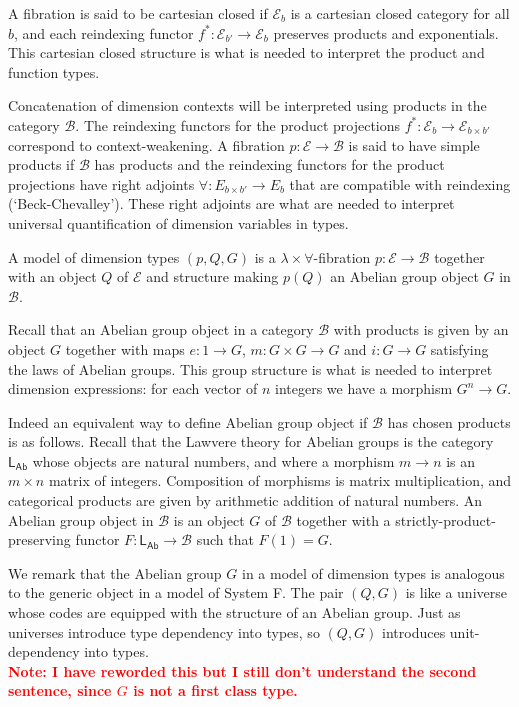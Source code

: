 \documentclass[a4paper,UKenglish]{lipics}
\newcommand\note[1]{{ \bf \textcolor{red} {\vspace{2mm}\; \\ Note: #1\\}}}
\newcommand{\msf}[1]{\mathsf{#1}} %
\newcommand{\LAb}{\msf{L}_{\msf{Ab}}}
\newcommand{\B}{\mathcal{B}}
\newcommand{\E}{\mathcal{E}}
\begin{document}
A fibration is said to be cartesian closed if $\E_b$ is a cartesian closed category for all $b$,
and each reindexing functor $f^*:\E_{b'}\to\E_b$ preserves products and exponentials.
This cartesian closed structure is what is needed to interpret the product and function types.

Concatenation of dimension contexts will be interpreted using
products in the category $\B$.
The reindexing functors for the product projections $f^*:\E_{b}\to \E_{b\times b'}$
correspond to context-weakening.
A fibration $p:\E\to \B$ is said to have simple products if $\B$ has products and
the reindexing functors for the product projections have right adjoints
$\forall:E_{b\times b'}\to E_b$
that are compatible with reindexing (`Beck-Chevalley').
These right adjoints
are what are needed to interpret universal quantification of dimension variables in types.

\begin{definition}
A model of dimension types $(p,Q,G)$ is a $\lambda\times\forall$-fibration $p:\E\to \B$
together with an object $Q$ of $\E$ and
structure making $p(Q)$ an Abelian group object $G$ in $\B$.
\end{definition}
Recall that an Abelian group object in a category $\B$ with products
is given by an object
$G$ together with maps $e:1\to G$, $m:G\times G\to G$ and
$i:G\to G$ satisfying the laws of Abelian groups.
This group structure is what is needed to interpret dimension expressions:
for each vector of $n$ integers we have
a morphism $G^n\to G$.

Indeed an equivalent way to define Abelian group object
if $\B$ has chosen products is as follows.
Recall that the Lawvere theory for Abelian groups is the category $\LAb$ whose
objects are natural numbers, and where a morphism $m\to n$ is an $m\times n$ matrix of integers.
Composition of morphisms is matrix multiplication, and categorical
products are given by arithmetic addition
of natural numbers.
An Abelian group object
in $\B$
is an object $G$ of $\B$
together with a strictly-product-preserving functor $F:\LAb\to\B$ such that $F(1)=G$.



We remark that the Abelian group $G$ in a model of dimension types
is analogous to the generic object in a model of System F.  The pair
$(Q,G)$ is like a universe whose codes are equipped with the structure
of an Abelian group.  Just as universes introduce type dependency into types, so $(Q,G)$
introduces unit-dependency into types.
\note{I have reworded this but I still don't understand the second sentence, since $G$ is not a
first class type.}
\end{document}
